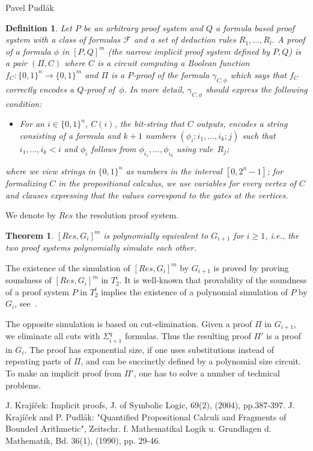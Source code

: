 \documentclass[report]{owrart}
\newtheorem{theorem}{Theorem}
\newtheorem{definition}{Definition}
\begin{document}
\begin{report}
\begin{talk}{Pavel Pudl\'ak}
\begin{definition}
Let $P$ be an arbitrary proof system and $Q$ a formula based proof system with a class of formulas $\mathcal F$ and a set of deduction rules $R_1,\dots, R_l$. A proof of a formula $\phi$ in $[P,Q]^m$ (the \emph{narrow implicit proof system} defined by $P,Q$) is a pair $(\Pi,C)$ where $C$ is a circuit computing a Boolean function $f_C:\{0,1\}^n\to\{0,1\}^m$ and $\Pi$ is a $P$-proof of the formula $\gamma_{C,\phi}$ which says that $f_C$ correctly encodes a $Q$-proof of~$\phi$. In more detail, $\gamma_{C,\phi}$ should express the following condition:
\begin{itemize}
\item For an $i\in \{0,1\}^n$, $C(i)$, the bit-string that $C$ outputs, encodes a string consisting of a formula and $k+1$ numbers $(\phi_i;i_1,\dots, i_k;j)$ such that $i_1,\dots, i_k<i$ and $\phi_i$ follows from $\phi_{i_1},\dots,\phi_{i_k}$ using rule~$R_j$;
  \end{itemize}
where we view strings in $\{0,1\}^n$ as numbers in the interval $[0,2^n-1]$;  
for formalizing $C$ in the propositional calculus, we use variables for every vertex of $C$ and clauses expressing that the values correspond to the gates at the vertices.
\end{definition}

We denote by $Res$ the resolution proof system.

\begin{theorem}
$[Res,G_i]^m$ is polynomially equivalent to $G_{i+1}$ for $i\geq 1$, i.e., the two proof systems polynomially simulate each other.
\end{theorem}

The existence of the simulation of $[Res,G_i]^m$ by $G_{i+1}$ is proved by proving soundness of  $[Res,G_i]^m$ in $T^i_2$. It is well-known that provability of the soundness of a proof system $P$ in $T^i_2$ implies the existence of a polynomial simulation of $P$ by $G_i$, see~\cite{krajicek-pudlak}.

\bigskip
The opposite simulation is based on cut-elimination. Given a proof $\Pi$ in $G_{i+1}$, we eliminate all cuts with $\Sigma^q_{i+1}$ formulas. Thus the resulting proof $\Pi'$ is a proof in $G_i$. The proof has exponential size, if one uses substitutions instead of repeating parts of $\Pi$, and can be succinctly defined by a polynomial size circuit. To make an implicit proof from $\Pi'$, one has to solve a number of technical problems.


\begin{thebibliography}{99}
 J. Kraj\'i\v cek: Implicit proofs, J. of Symbolic Logic, 69(2), (2004), pp.387-397. 
 J. Kraj\'i\v cek and P. Pudl\'{a}k: "Quantified Propositional Calculi and Fragments of Bounded Arithmetic", Zeitschr. f. Mathematikal Logik u. Grundlagen d. Mathematik, Bd. 36(1), (1990), pp. 29-46. 
\end{thebibliography}


\end{talk}
\end{report}
\end{document}
